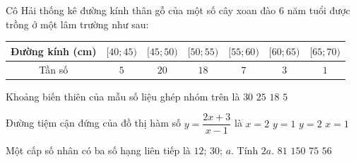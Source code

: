 \begin{ex}%
	Cô Hải thống kê đường kính thân gỗ của một số cây xoan đào $6$ năm tuổi được trồng ở một lâm trường như sau:
	\begin{center}
		\renewcommand{\arraystretch}{1.5}
		\begin{tabular}{|c|c|c|c|c|c|c|}
			\hline
			Đường kính (cm) & $[40; 45)$ & $[45; 50)$ & $[50; 55)$ & $[55; 60)$ & $[60; 65)$ & $[65; 70)$ \\
			\hline
			Tần số & $5$ & $20$ & $18$ & $7$ & $3$ & $1$ \\
			\hline
		\end{tabular}
	\end{center}
	Khoảng biến thiên của mẫu số liệu ghép nhóm trên là
	\choice
	{\True $30$}
	{$25$}
	{$18$}
	{$5$}
\end{ex}
\begin{ex}%
	Đường tiệm cận đứng của đồ thị hàm số $y = \dfrac{2x+3}{x-1}$ là
	\choice
	{$x = 2$}
	{$y = 1$}
	{$y = 2$}
	{\True $x = 1$}
\end{ex}
\begin{ex}%
	Một cấp số nhân có ba số hạng liên tiếp là $12$; $30$; $a$. Tính $2a$.
	\choice
	{$81$}
	{\True $150$}
	{$75$}
	{$56$}
\end{ex}
